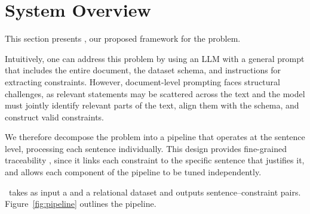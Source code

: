 \section{System Overview}
\label{sec:overview}


This section presents \system, our proposed framework for the  problem. 

Intuitively, one can address this problem by using an LLM with a general prompt that includes the entire document, the dataset schema, and instructions for extracting constraints. However, document-level prompting faces structural challenges, as relevant statements may be scattered across the text and the model must jointly identify relevant parts of the text, align them with the schema, and construct valid constraints. 


We therefore decompose the problem into a pipeline that operates at the sentence level, processing each sentence individually. This design provides fine-grained traceability , since it links each constraint to the specific sentence that justifies it, and allows each component of the pipeline to be tuned independently.

\system\ takes as input a  and a relational dataset and outputs sentence--constraint pairs. Figure~\ref{fig:pipeline} outlines the pipeline.

